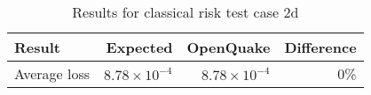 \begin{table}[htbp]

\centering
\begin{tabular}{ l r r r }

\hline
\rowcolor{anti-flashwhite}
\bf{Result} & \bf{Expected} & \bf{OpenQuake} & \bf{Difference}\\
\hline
Average loss & $8.78 \times 10^{-4}$ & $8.78 \times 10^{-4}$ & 0\% \\
\hline
\end{tabular}

\caption{Results for classical risk test case 2d}
\label{tab:result-cr-2d}
\end{table}
